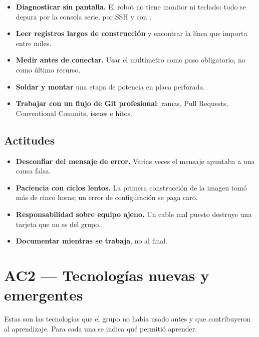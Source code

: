 \documentclass[11pt,a4paper]{article}
\newcommand{\id}[1]{\texttt{\detokenize{#1}}}
\begin{document}
\begin{itemize}
  \item \textbf{Diagnosticar sin pantalla.} El robot no tiene monitor ni
        teclado: todo se depura por la consola serie, por SSH y con
        \id{journalctl}.
  \item \textbf{Leer registros largos de construcción} y encontrar la línea
        que importa entre miles.
  \item \textbf{Medir antes de conectar.} Usar el multímetro como paso
        obligatorio, no como último recurso.
  \item \textbf{Soldar y montar} una etapa de potencia en placa perforada.
  \item \textbf{Trabajar con un flujo de Git profesional}: ramas, Pull
        Requests, Conventional Commits, issues e hitos.
\end{itemize}

\subsection{Actitudes}

\begin{itemize}
  \item \textbf{Desconfiar del mensaje de error.} Varias veces el mensaje
        apuntaba a una causa falsa.
  \item \textbf{Paciencia con ciclos lentos.} La primera construcción de la
        imagen tomó más de cinco horas; un error de configuración se paga caro.
  \item \textbf{Responsabilidad sobre equipo ajeno.} Un cable mal puesto
        destruye una tarjeta que no es del grupo.
  \item \textbf{Documentar mientras se trabaja}, no al final.
\end{itemize}

\section{AC2 --- Tecnologías nuevas y emergentes}

Estas son las tecnologías que el grupo no había usado antes y que
contribuyeron al aprendizaje. Para cada una se indica qué permitió aprender.
\end{document}
